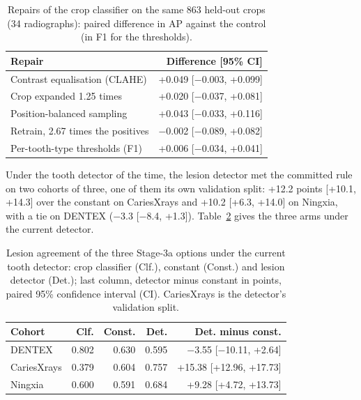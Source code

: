 \documentclass[conference]{IEEEtran}
\begin{document}
\begin{table}[t]
\centering
\caption{Repairs of the crop classifier on the same 863 held-out crops (34 radiographs): paired difference in AP against the control (in F1 for the thresholds).}
\label{tab:6}
\footnotesize
\setlength{\tabcolsep}{3pt}
\begin{tabular}{>{\raggedright\arraybackslash}p{4.49cm}r}
\toprule
Repair & Difference [95\% CI] \\
\midrule
Contrast equalisation (CLAHE) & +0.049 [$-$0.003, +0.099] \\
Crop expanded 1.25 times & +0.020 [$-$0.037, +0.081] \\
Position-balanced sampling & +0.043 [$-$0.033, +0.116] \\
Retrain, 2.67 times the positives & $-$0.002 [$-$0.089, +0.082] \\
Per-tooth-type thresholds (F1) & +0.006 [$-$0.034, +0.041] \\
\bottomrule
\end{tabular}
\end{table}

Under the tooth detector of the time, the lesion detector met the committed rule on two cohorts of three, one of them its own validation split: +12.2 points [+10.1, +14.3] over the constant on CariesXrays and +10.2 [+6.3, +14.0] on Ningxia, with a tie on DENTEX ($-$3.3 [$-$8.4, +1.3]). Table~\ref{tab:7} gives the three arms under the current detector.

\begin{table}[t]
\centering
\caption{Lesion agreement of the three Stage-3a options under the current tooth detector: crop classifier (Clf.), constant (Const.) and lesion detector (Det.); last column, detector minus constant in points, paired 95\% confidence interval (CI). CariesXrays is the detector's validation split.}
\label{tab:7}
\footnotesize
\setlength{\tabcolsep}{3pt}
\begin{tabular}{>{\raggedright\arraybackslash}p{1.65cm}rrrr}
\toprule
Cohort & Clf. & Const. & Det. & Det. minus const. \\
\midrule
DENTEX & 0.802 & 0.630 & 0.595 & $-$3.55 [$-$10.11, +2.64] \\
CariesXrays & 0.379 & 0.604 & 0.757 & +15.38 [+12.96, +17.73] \\
Ningxia & 0.600 & 0.591 & 0.684 & +9.28 [+4.72, +13.73] \\
\bottomrule
\end{tabular}
\end{table}
\end{document}
